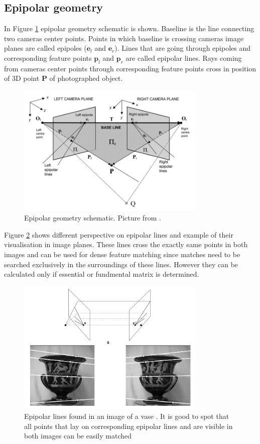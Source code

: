 \subsection{Epipolar geometry}
In Figure \ref{fig:epipolar_geometry} epipolar geometry schematic is shown. Baseline is the line connecting two cameras center points. Points in which baseline is crossing cameras image planes are called epipoles ($\textbf{e}_l$ and $\textbf{e}_r$). Lines that are going through epipoles and corresponding feature points $\textbf{p}_l$ and $\textbf{p}_r$ are called epipolar lines. Rays coming from cameras center points through corresponding feature points cross in position of 3D point \textbf{P} of photographed object.
\begin{figure}[!h]
    \centering
    \includegraphics[width=0.8\textwidth]{epipolar_geometry}
    \caption{Epipolar geometry schematic. Picture from \cite{Cyganek3dVision}. }
    \label{fig:epipolar_geometry}
\end{figure}
Figure \ref{fig:EpipolarGeometry} shows different perspective on epipolar lines and example of their visualisation in image planes. These lines cross the exactly same points in both images and can be used for dense feature matching since matches need to be searched exclusively in the surroundings of these lines. However they can be calculated only if essential or fundmental matrix is determined.
\begin{figure}[!h]
    \centering
    \includegraphics[width=0.8\textwidth]{EpipolarGeometry}
    \caption[Epipolar lines found in an image of a vase]{Epipolar lines found in an image of a vase \cite{HartleyMultipleView}. It is good to spot that all points that lay on corresponding epipolar lines and are visible in both images can be easily matched}
    \label{fig:EpipolarGeometry}
\end{figure} \\
